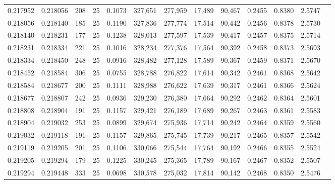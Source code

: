 \begin{tabular}{rrrrrrrrrrrrr}
0.217952 & 0.218056 &   208 &  25 &                                     0.1073 & 327,651 & 277,959 &  17,489 &  90,467 & 0.2455 & 0.8380 & 2.5747 \\
0.218056 & 0.218140 &   185 &  25 &                                     0.1190 & 327,836 & 277,774 &  17,514 &  90,442 & 0.2456 & 0.8378 & 2.5730 \\
0.218140 & 0.218231 &   177 &  25 &                                     0.1238 & 328,013 & 277,597 &  17,539 &  90,417 & 0.2457 & 0.8375 & 2.5714 \\
0.218231 & 0.218334 &   221 &  25 &                                     0.1016 & 328,234 & 277,376 &  17,564 &  90,392 & 0.2458 & 0.8373 & 2.5693 \\
0.218334 & 0.218450 &   248 &  25 &                                     0.0916 & 328,482 & 277,128 &  17,589 &  90,367 & 0.2459 & 0.8371 & 2.5670 \\
0.218452 & 0.218584 &   306 &  25 &                                     0.0755 & 328,788 & 276,822 &  17,614 &  90,342 & 0.2461 & 0.8368 & 2.5642 \\
0.218584 & 0.218677 &   200 &  25 &                                     0.1111 & 328,988 & 276,622 &  17,639 &  90,317 & 0.2461 & 0.8366 & 2.5624 \\
0.218677 & 0.218807 &   242 &  25 &                                     0.0936 & 329,230 & 276,380 &  17,664 &  90,292 & 0.2462 & 0.8364 & 2.5601 \\
0.218808 & 0.218904 &   191 &  25 &                                     0.1157 & 329,421 & 276,189 &  17,689 &  90,267 & 0.2463 & 0.8361 & 2.5583 \\
0.218904 & 0.219032 &   253 &  25 &                                     0.0899 & 329,674 & 275,936 &  17,714 &  90,242 & 0.2464 & 0.8359 & 2.5560 \\
0.219032 & 0.219118 &   191 &  25 &                                     0.1157 & 329,865 & 275,745 &  17,739 &  90,217 & 0.2465 & 0.8357 & 2.5542 \\
0.219119 & 0.219205 &   201 &  25 &                                     0.1106 & 330,066 & 275,544 &  17,764 &  90,192 & 0.2466 & 0.8355 & 2.5524 \\
0.219205 & 0.219294 &   179 &  25 &                                     0.1225 & 330,245 & 275,365 &  17,789 &  90,167 & 0.2467 & 0.8352 & 2.5507 \\
0.219294 & 0.219448 &   333 &  25 &                                     0.0698 & 330,578 & 275,032 &  17,814 &  90,142 & 0.2468 & 0.8350 & 2.5476 \\

\end{tabular}
